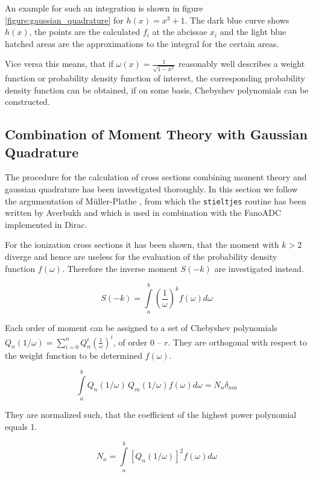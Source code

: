 An example for such an integration is shown in figure \ref{figure:gaussian_quadrature}
for $h(x) = x^3 + 1$. The dark blue curve shows $h(x)$, the points are the
calculated $f_i$ at the abcissae $x_i$ and the light blue hatched areas are the
approximations to the integral for the certain areas.

Vice versa this means, that if $\omega(x) = \frac {1}{\sqrt{1-x^2}}$ reasonably
well describes a weight function or probability density function of interest,
the corresponding probability density function can be obtained, if on some basis,
Chebyshev polynomials
can be constructed.


\subsection{Combination of Moment Theory with Gaussian Quadrature}
The procedure for the calculation of cross sections combining moment
theory and gaussian quadrature has been investigated thoroughly. In this section
we follow the argumentation of Müller-Plathe \cite{}, from which the
\verb|stieltjes| routine has been written by Averbukh and which is used in
combination with the FanoADC implemented in Dirac.

For the ionization cross sections it has been shown, that the moment with
$k>2$ diverge and hence are useless for the evaluation of the probability
density function $f(\omega)$. Therefore the inverse moment $S(-k)$ are investigated
instead.

\begin{equation}
  S(-k) = \int\limits_a^b \left( \frac{1}{\omega} \right) ^k f(\omega) d\omega
\end{equation}

Each order of moment can be assigned to a set of Chebyshev polynomials
$Q_n (1/\omega) = \sum\limits_{i=0}^n Q_n^{i}\left( \frac{1}{\omega} \right)^{i}$,
of order $0$ -- $r$. They are orthogonal with respect to the weight function
to be determined $f(\omega)$.

\begin{equation}
  \int\limits_a^b Q_n(1/\omega) \, Q_m(1/\omega) f(\omega) d\omega = N_n \delta_{nm}
\end{equation}

They are normalized such, that the coefficient of the highest power polynomial
equals 1.

\begin{equation}
  N_n = \int\limits_a^b \left[ Q_n(1/\omega) \right]^2 f(\omega) d\omega
\end{equation}

